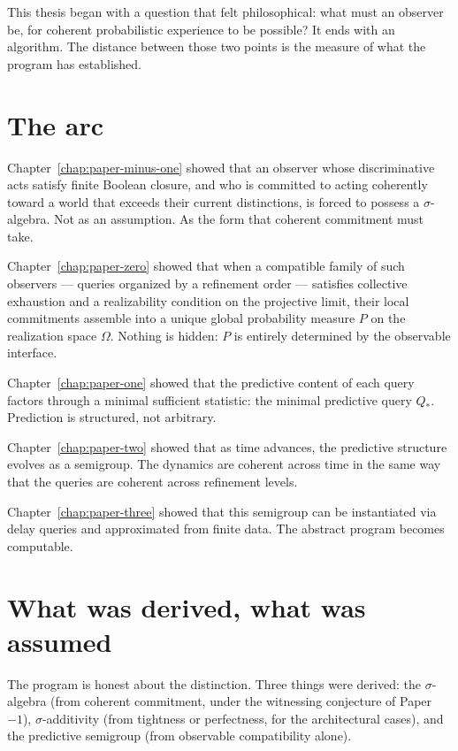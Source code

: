 
This thesis began with a question that felt philosophical: what must
an observer be, for coherent probabilistic experience to be possible?
It ends with an algorithm.  The distance between those two points is
the measure of what the program has established.

\section*{The arc}

Chapter~\ref{chap:paper-minus-one} showed that an observer whose
discriminative acts satisfy finite Boolean closure, and who is
committed to acting coherently toward a world that exceeds their
current distinctions, is forced to possess a $\sigma$-algebra.  Not
as an assumption.  As the form that coherent commitment must take.

Chapter~\ref{chap:paper-zero} showed that when a compatible family
of such observers --- queries organized by a refinement order ---
satisfies collective exhaustion and a realizability condition on the
projective limit, their local commitments assemble into a unique
global probability measure $P$ on the realization space $\Omega$.
Nothing is hidden: $P$ is entirely determined by the observable
interface.

Chapter~\ref{chap:paper-one} showed that the predictive content of
each query factors through a minimal sufficient statistic: the
minimal predictive query $Q_*$.  Prediction is structured, not
arbitrary.

Chapter~\ref{chap:paper-two} showed that as time advances, the
predictive structure evolves as a semigroup.  The dynamics are
coherent across time in the same way that the queries are coherent
across refinement levels.

Chapter~\ref{chap:paper-three} showed that this semigroup can be
instantiated via delay queries and approximated from finite data.
The abstract program becomes computable.

\section*{What was derived, what was assumed}

The program is honest about the distinction.  Three things were
derived: the $\sigma$-algebra (from coherent commitment, under the
witnessing conjecture of Paper~$-1$), $\sigma$-additivity (from
tightness or perfectness, for the architectural cases), and the
predictive semigroup (from observable compatibility alone).

